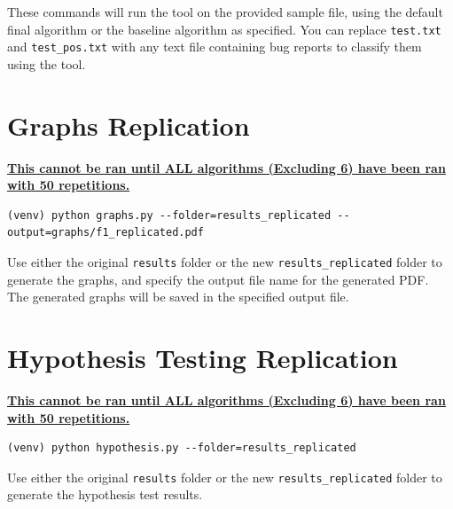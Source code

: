 \documentclass{article}
\begin{document}
These commands will run the tool on the provided sample file, using the default final algorithm or the baseline algorithm as specified. You can replace \texttt{test.txt} and \texttt{test\_pos.txt} with any text file containing bug reports to classify them using the tool.


\section*{Graphs Replication}

\underline{\textbf{This cannot be ran until ALL algorithms (Excluding 6) have been ran with 50 repetitions.}}

\begin{verbatim}
(venv) python graphs.py --folder=results_replicated --output=graphs/f1_replicated.pdf
\end{verbatim}

Use either the original \texttt{results} folder or the new \texttt{results\_replicated} folder to generate the graphs, and specify the output file name for the generated PDF.\\
The generated graphs will be saved in the specified output file.


\section*{Hypothesis Testing Replication}

\underline{\textbf{This cannot be ran until ALL algorithms (Excluding 6) have been ran with 50 repetitions.}}

\begin{verbatim}
(venv) python hypothesis.py --folder=results_replicated
\end{verbatim}

Use either the original \texttt{results} folder or the new \texttt{results\_replicated} folder to generate the hypothesis test results.
\end{document}
